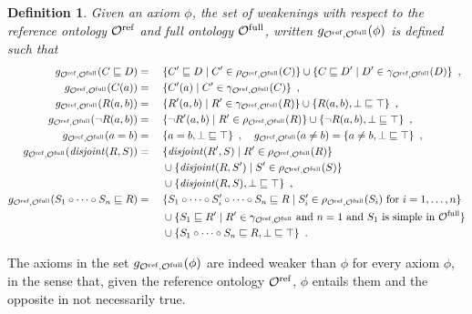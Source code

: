 \documentclass[
]{ceurart}
\newtheorem{definition}{Definition}
\begin{document}
\begin{definition}
  Given an axiom $\phi$, the set of \emph{weakenings} with respect to the reference ontology ${\mathcal{O}^\textnormal{ref}}$ and full ontology ${\mathcal{O}^\textnormal{full}}$, written $g_{{\mathcal{O}^\textnormal{ref}},{\mathcal{O}^\textnormal{full}}}(\phi)$ is defined such that
  {\footnotesize
  \begin{alignat*}{2}
    g_{{\mathcal{O}^\textnormal{ref}},{\mathcal{O}^\textnormal{full}}}(C \sqsubseteq D) &={} &&\{ C' \sqsubseteq D \mid C' \in \rho_{{\mathcal{O}^\textnormal{ref}},{\mathcal{O}^\textnormal{full}}} (C) \} \cup \{ C \sqsubseteq D' \mid D' \in \gamma_{{\mathcal{O}^\textnormal{ref}},{\mathcal{O}^\textnormal{full}}}(D) \} \enspace, \\
    g_{{\mathcal{O}^\textnormal{ref}},{\mathcal{O}^\textnormal{full}}}(C(a)) &={} && \{ C'(a) \mid C' \in \gamma_{{\mathcal{O}^\textnormal{ref}},{\mathcal{O}^\textnormal{full}}}(C) \} \enspace, \\
    g_{{\mathcal{O}^\textnormal{ref}},{\mathcal{O}^\textnormal{full}}}(R(a, b)) &={} && \{ R'(a, b) \mid R' \in \gamma_{{\mathcal{O}^\textnormal{ref}},{\mathcal{O}^\textnormal{full}}}(R) \} \cup \{ R(a, b), \bot \sqsubseteq \top \} \enspace, \\
    g_{{\mathcal{O}^\textnormal{ref}},{\mathcal{O}^\textnormal{full}}}(\lnot R(a, b)) &={} && \{ \lnot R'(a, b) \mid R' \in \rho_{{\mathcal{O}^\textnormal{ref}},{\mathcal{O}^\textnormal{full}}}(R) \} \cup \{ \lnot R(a, b), \bot \sqsubseteq \top \} \enspace, \\
    g_{{\mathcal{O}^\textnormal{ref}},{\mathcal{O}^\textnormal{full}}}(a = b) &={} && \{ a = b, \bot \sqsubseteq \top \} \enspace,
    \quad g_{{\mathcal{O}^\textnormal{ref}},{\mathcal{O}^\textnormal{full}}}(a \not= b) = \{ a \not= b, \bot \sqsubseteq \top \} \enspace, \\
    g_{{\mathcal{O}^\textnormal{ref}},{\mathcal{O}^\textnormal{full}}}(\mathit{disjoint}(R, S)) &={} &&\{ \mathit{disjoint}(R', S) \mid R' \in \rho_{{\mathcal{O}^\textnormal{ref}},{\mathcal{O}^\textnormal{full}}} (R) \} \\
    &&& \cup \{ \mathit{disjoint}(R, S') \mid S' \in \rho_{{\mathcal{O}^\textnormal{ref}},{\mathcal{O}^\textnormal{full}}}(S) \} \\
    &&& \cup \{ \mathit{disjoint} (R, S), \bot \sqsubseteq \top \} \enspace, \\
    g_{{\mathcal{O}^\textnormal{ref}},{\mathcal{O}^\textnormal{full}}}(S_1 \circ \cdots \circ S_n \sqsubseteq R) &={} && \{ S_1 \circ \cdots \circ S_i' \circ \cdots \circ S_n \sqsubseteq R \mid S_i' \in \rho_{{\mathcal{O}^\textnormal{ref}},{\mathcal{O}^\textnormal{full}}}(S_i) \text{ for } i = 1, \dots, n \} \\
    &&& \cup \{ S_1 \sqsubseteq R' \mid R' \in \gamma_{{\mathcal{O}^\textnormal{ref}},{\mathcal{O}^\textnormal{full}}} \text{ and } n = 1 \text{ and } S_1 \text{ is simple in } {\mathcal{O}^\textnormal{full}} \} \\
    &&& \cup \{ S_1 \circ \cdots \circ S_n \sqsubseteq R, \bot \sqsubseteq \top \} \enspace.
  \end{alignat*}
  }
\end{definition}

The axioms in the set $g_{{\mathcal{O}^\textnormal{ref}},{\mathcal{O}^\textnormal{full}}}(\phi)$ are indeed weaker than $\phi$ for every axiom $\phi$, in the sense that, given the reference ontology ${\mathcal{O}^\textnormal{ref}}$, $\phi$ entails them and the opposite in not necessarily true.
\end{document}
